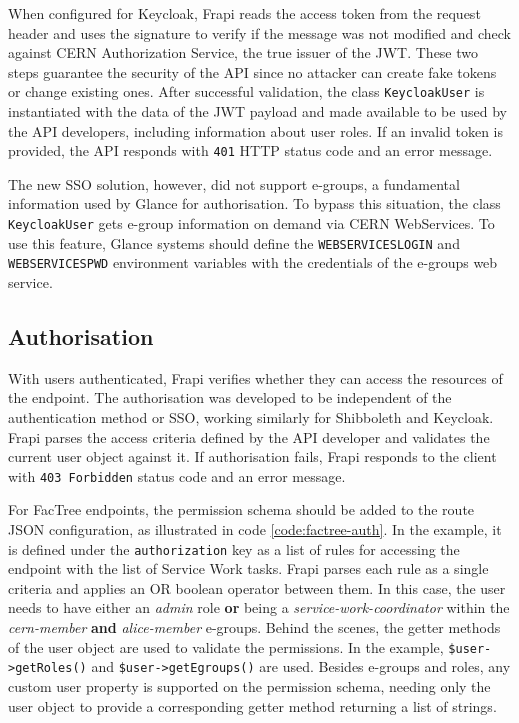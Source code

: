 
When configured for Keycloak, Frapi reads the access token from the request header and uses the signature to verify if the message was not modified and check against CERN Authorization Service, the true issuer of the JWT. These two steps guarantee the security of the API since no attacker can create fake tokens or change existing ones. After successful validation, the class \texttt{KeycloakUser} is instantiated with the data of the JWT payload and made available to be used by the API developers, including information about user roles. If an invalid token is provided, the API responds with \texttt{401} HTTP status code and an error message.

The new SSO solution, however, did not support e-groups, a fundamental information used by Glance for authorisation. To bypass this situation, the class \texttt{KeycloakUser} gets e-group information on demand via CERN WebServices. To use this feature, Glance systems should define the \texttt{WEBSERVICES\textunderscore LOGIN} and \texttt{WEBSERVICES\textunderscore PWD} environment variables with the credentials of the e-groups web service.

\subsection{Authorisation}
\label{sec:frapi-v1-authorisation}

With users authenticated, Frapi verifies whether they can access the resources of the endpoint. The authorisation was developed to be independent of the authentication method or SSO, working similarly for Shibboleth and Keycloak. Frapi parses the access criteria defined by the API developer and validates the current user object against it. If authorisation fails, Frapi responds to the client with \texttt{403 Forbidden} status code and an error message.

For FacTree endpoints, the permission schema should be added to the route JSON configuration, as illustrated in code \autoref{code:factree-auth}. In the example, it is defined under the \texttt{authorization} key as a list of rules for accessing the endpoint with the list of Service Work tasks. Frapi parses each rule as a single criteria and applies an OR boolean operator between them. In this case, the user needs to have either an \textit{admin} role \textbf{or} being a \textit{service-work-coordinator} within the \textit{cern-member} \textbf{and} \textit{alice-member} e-groups. Behind the scenes, the getter methods of the user object are used to validate the permissions. In the example, \texttt{\$user->getRoles()} and \texttt{\$user->getEgroups()} are used. Besides e-groups and roles, any custom user property is supported on the permission schema, needing only the user object to provide a corresponding getter method returning a list of strings.

